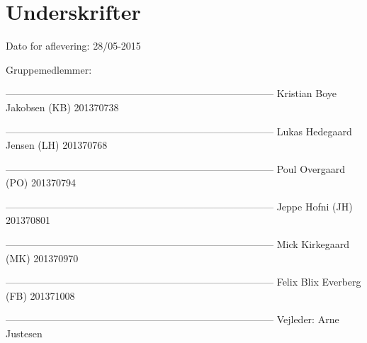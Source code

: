 \chapter*{Underskrifter}

Dato for aflevering: 28/05-2015

Gruppemedlemmer: \newline


--------------------------------------------------------------------------------- \newline
Kristian Boye Jakobsen (KB) 201370738\newline


--------------------------------------------------------------------------------- \newline
Lukas Hedegaard Jensen (LH) 201370768\newline


--------------------------------------------------------------------------------- \newline
Poul Overgaard (PO) 201370794\newline


--------------------------------------------------------------------------------- \newline
Jeppe Hofni (JH) 201370801\newline


--------------------------------------------------------------------------------- \newline
Mick Kirkegaard (MK) 201370970\newline


--------------------------------------------------------------------------------- \newline
Felix Blix Everberg (FB) 201371008\newline













--------------------------------------------------------------------------------- \newline
Vejleder: Arne Justesen \newline

\afterpage{\null\newpage}

